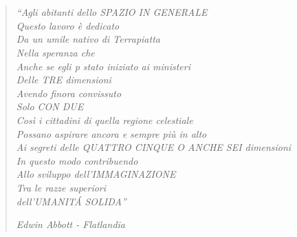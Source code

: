 
	\chapter*{}
		\begin{quote}
			\emph{``Agli abitanti dello SPAZIO IN GENERALE\\
			Questo lavoro è dedicato\\
			Da un umile nativo di Terrapiatta\\
			Nella speranza che\\
			Anche se egli p stato iniziato ai ministeri\\
			Delle TRE dimensioni\\
			Avendo finora convissuto\\
			Solo CON DUE\\
			Così i cittadini di quella regione celestiale\\
			Possano aspirare ancora e sempre più in alto\\
			Ai segreti delle QUATTRO CINQUE O ANCHE SEI dimensioni\\
			In questo modo contribuendo\\
			Allo sviluppo dell'IMMAGINAZIONE\\
			Tra le razze superiori\\
			dell'UMANIT\'A SOLIDA''\\}
		
			\hfill\textit{Edwin Abbott - Flatlandia}						
			
		\end{quote}
